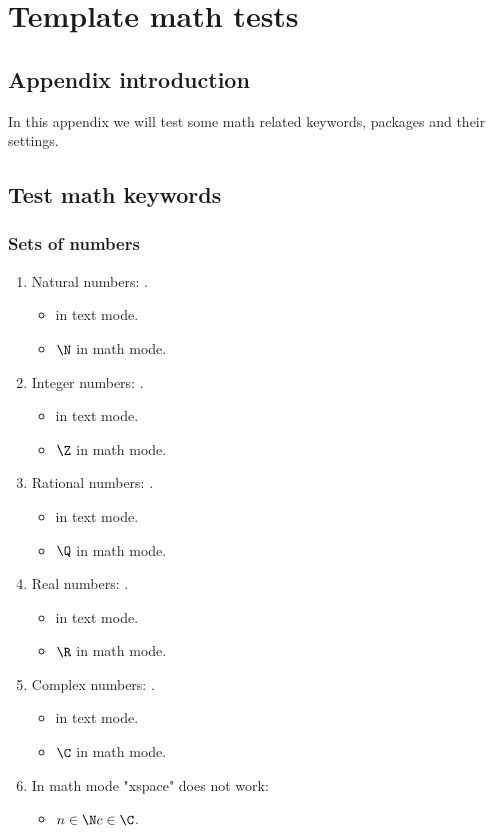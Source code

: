 \chapter{Template math tests}
\label{appendix:math-test}
\acresetall

\section{Appendix introduction}

In this appendix we will test some math related keywords, packages and their settings.

\section{Test math keywords}

\subsection{Sets of numbers}

\begin{enumerate}

\item Natural numbers: \N.
\begin{itemize}
\item \N in text mode.
\item $\N$ in math mode.
\end{itemize}

\item Integer numbers: \Z.
\begin{itemize}
\item \Z in text mode.
\item $\Z$ in math mode.
\end{itemize}

\item Rational numbers: \Q.
\begin{itemize}
\item \Q in text mode.
\item $\Q$ in math mode.
\end{itemize}

\item Real numbers: \R.
\begin{itemize}
\item \R in text mode.
\item $\R$ in math mode.
\end{itemize}

\item Complex numbers: \C.
\begin{itemize}
\item \C in text mode.
\item $\C$ in math mode.
\end{itemize}

\item In math mode "xspace" does not work:
\begin{itemize}
\item $n \in \N c \in \C$.
\end{itemize}

\end{enumerate}

